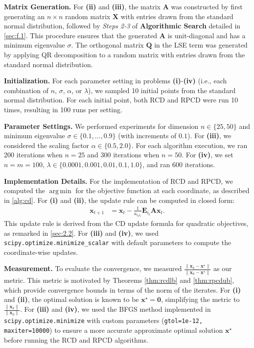\documentclass{article}
\theoremstyle{plain}
\theoremstyle{definition}
\theoremstyle{remark}
\def\vzero{{\bm{0}}}
\def\vx{{\bm{x}}}
\def\mA{{\bm{A}}}
\def\mE{{\bm{E}}}
\def\mQ{{\bm{Q}}}
\def\mX{{\bm{X}}}
\DeclareMathOperator*{\argmin}{arg\,min}
\begin{document}
\textbf{Matrix Generation.}
For \textbf{(ii)} and \textbf{(iii)}, the matrix $\mA$ was constructed by first generating an $n\times n$ random matrix $\mX$ with entries drawn from the standard normal distribution, followed by \emph{Steps 2-3} of \textbf{Algorithmic Search} detailed in \cref{sec:f.1}. This procedure ensures that the generated $\mA$ is unit-diagonal and has a minimum eigenvalue $\sigma$. The orthogonal matrix $\mQ$ in the LSE term was generated by applying QR decomposition to a random matrix with entries drawn from the standard normal distribution.

\textbf{Initialization.}
For each parameter setting in problems \textbf{(i)}-\textbf{(iv)} (i.e., each combination of $n$, $\sigma$, $\alpha$, or $\lambda$), we sampled 10 initial points from the standard normal distribution. For each initial point, both RCD and RPCD were run 10 times, resulting in 100 runs per setting.

\textbf{Parameter Settings.}
We performed experiments for dimension $n \in \{25, 50\}$ and minimum eigenvalue $\sigma \in \{0.1, \dots, 0.9\}$ (with increments of $0.1$). For \textbf{(iii)}, we considered the scaling factor $\alpha \in \{0.5, 2.0\}$. For each algorithm execution, we ran 200 iterations when $n=25$ and 300 iterations when $n=50$. For \textbf{(iv)}, we set $n = m = 100$, $\lambda \in \{0.0001, 0.001, 0.01, 0.1, 1.0\}$, and ran 600 iterations.

\textbf{Implementation Details.}
For the implementation of RCD and RPCD, we computed the $\argmin$ for the objective function at each coordinate, as described in \cref{alg:cd}.
For \textbf{(i)} and \textbf{(ii)}, the update rule can be computed in closed form:
\begin{align*}
    \vx_{t+1} &= \vx_{t} - \frac{1}{a_{i_t i_t}} \mE_{i_t} \mA \vx_{t}.
\end{align*}
This update rule is derived from the CD update formula for quadratic objectives, as remarked in \cref{sec:2.2}. For \textbf{(iii)} and \textbf{(iv)}, we used \texttt{scipy.optimize.minimize\_scalar} with default parameters to compute the coordinate-wise updates.

\textbf{Measurement.}
To evaluate the convergence, we measured $\frac{\|\vx_k - \vx^{\star}\|}{\|\vx_0 - \vx^{\star}\|}$ as our metric. This metric is motivated by Theorems \ref{thm:rcdlb} and \ref{thm:rpcdub}, which provide convergence bounds in terms of the norm of the iterates. 
For \textbf{(i)} and \textbf{(ii)}, the optimal solution is known to be $\vx^{\star} = \vzero$, simplifying the metric to $\frac{\|\vx_k\|}{\|\vx_0\|}$. 
For \textbf{(iii)} and \textbf{(iv)}, we used the BFGS method implemented in \texttt{scipy.optimize.minimize} with custom parameters (\texttt{gtol=1e-12, maxiter=10000}) to ensure a more accurate approximate optimal solution $\vx^{\star}$ before running the RCD and RPCD algorithms.
\end{document}

